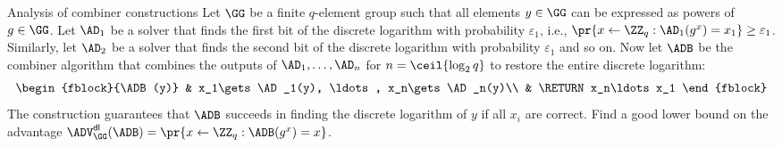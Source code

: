 \documentclass{crypto-exercise}
\author[Formalisation of folklore]{Sven Laur}
\begin{document}
\begin{exercise}{Analysis of combiner constructions}
Let $\GG$ be a finite $q$-element group such that all elements $y\in\GG$ can be expressed as powers of $g\in\GG$. Let $\AD_1$ be a solver that finds the first bit of the discrete logarithm with probability $\varepsilon_1$, i.e., $\pr{x\gets \ZZ_{q}: \AD_1(g^x)=x_1}\geq\varepsilon_1$. Similarly, let  $\AD_2$ be a solver that finds the second bit of the discrete logarithm with probability $\varepsilon_1$ and so on. Now let $\ADB$ be the combiner algorithm that combines the outputs of $\AD_1,\ldots,\AD_n$ for $n=\ceil{\log_2 q}$ to restore the entire discrete logarithm:   
\begin{align*}
    \begin{fblock}{\ADB(y)}
    & x_1\gets\AD_1(y), \ldots, x_n\gets\AD_n(y)\\
    & \RETURN x_n\ldots x_1  
    \end{fblock}     
\end{align*}%
The construction guarantees that $\ADB$ succeeds in finding the discrete logarithm of $y$ if all $x_i$ are correct. Find a good lower bound on the advantage $\ADVDL{\GG}{\ADB}=\pr{x\gets \ZZ_{q}: \ADB(g^x)=x}$.
\end{exercise}
  
\begin{solution} 

\end{solution}
\end{document}
